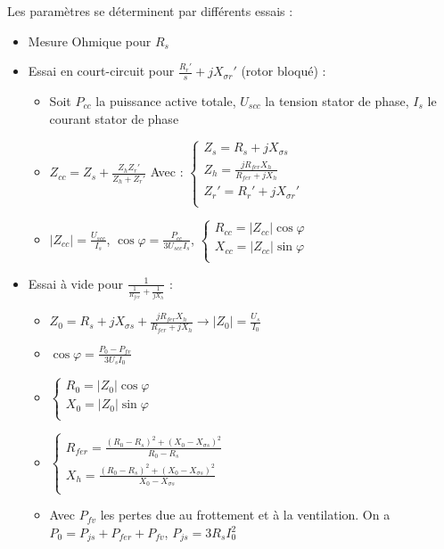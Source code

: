 \documentclass[../main.tex]{subfiles}
\begin{document}
Les paramètres se déterminent par différents essais : \begin{itemize}
    \item Mesure Ohmique pour $R_s$\\
    \item Essai en court-circuit pour $\frac{R_r'}{s} + jX_{\sigma r}'$ (rotor bloqué) : \begin{itemize}
        \item Soit $P_{cc}$ la puissance active totale, $U_{scc}$ la tension stator de phase, $I_s$ le courant stator de phase\\
        \item $Z_{cc} = Z_s + \frac{Z_h Z_r'}{Z_h+Z_r'}$ Avec : $\begin{cases}
            Z_s = R_s + jX_{\sigma s}\\
            Z_h = \frac{jR_{fer}X_h}{R_{fer} + jX_h}\\
            Z_r' = R_r' + jX_{\sigma r}'\\
        \end{cases}$\\
        \item $\lvert Z_{cc} \rvert = \frac{U_{scc}}{I_s}$, $\cos \varphi = \frac{P_{cc}}{3U_{scc}I_s}$, $\begin{cases}
            R_{cc} = \lvert Z_{cc}\rvert \cos \varphi\\
            X_{cc} = \lvert Z_{cc} \rvert \sin \varphi\\
        \end{cases}$
    \end{itemize}
    \item Essai à vide pour $\frac{1}{\frac{1}{R_{fer}} + \frac{1}{jX_h}}$ : \begin{itemize}
        \item $Z_0 = R_s+jX_{\sigma s} + \frac{jR_{fer}X_h}{R_{fer} + jX_h} \rightarrow \lvert Z_0 \rvert = \frac{U_s}{I_0}$\\
        \item $\cos \varphi = \frac{P_0-P_{fv}}{3U_sI_0}$\\
        \item $\begin{cases}
            R_0 = \lvert Z_0 \rvert \cos \varphi\\
            X_0 = \lvert Z_0 \rvert \sin \varphi\\
        \end{cases}$\\
        \item $\begin{cases}
            R_{fer} = \frac{(R_0-R_s)^2+(X_0-X_{\sigma s})^2}{R_0-R_s}\\
            X_h = \frac{(R_0-R_s)^2 + (X_0-X_{\sigma s})^2}{X_0-X_{\sigma s}}\\
        \end{cases}$\\
        \item Avec $P_{fv}$ les pertes due au frottement et à la ventilation. On a $P_0 = P_{js} + P_{fer} + P_{fv}$, $P_{js} = 3R_sI_0^2$\\
    \end{itemize}
\end{itemize}
\end{document}
